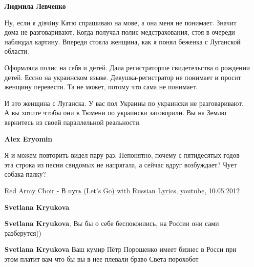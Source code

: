 \begin{itemize}
\begin{itemize}
\textbf{Людмила Левченко} 

Ну, если я дiвчiну Катю спрашиваю на мове, а она меня не понимает. Значит дома
не разговаривают. Когда получал полис медстрахования, стоя в очереди наблюдал
картину. Впереди стояла женщина, как я понял беженка с Луганской области.

Оформляла полис на себя и детей. Дала регистраторше свидетельства о рождении
детей. Ессно на украинском языке. Девушка-регистратор не понимает и просит
женщину перевести. Та не может, потому что сама не понимает. 

И это женщина с Луганска. У вас пол Украины по украински не разговаривают. А вы
хотите чтобы они в Тюмени по украински заговорили. Вы на Землю вернитесь из
своей параллельной реальности.

 
\textbf{Alex Eryomin} 

Я и можем повторить видел пару раз. Непонятно, почему с пятидесятых годов эта
строка из песни свидомых не напрягала, а сейчас вдруг возбуждает? Чует собака
палку? 

\href{https://youtu.be/tLk4ER6RyXs}{Red Army Choir - В путь (Let's Go) with Russian Lyrics, youtube, 10.05.2012}

 
\textbf{Svetlana Kryukova}

 
\textbf{Svetlana Kryukova}, Вы бы о себе беспокоились, на России они сами разберутся))

 
\textbf{Svetlana Kryukova} Ваш кумир Пётр Порошенко имеет бизнес в Росси при этом платит вам что бы вы в нее плевали браво Света порохобот


\end{itemize}
\end{itemize}

